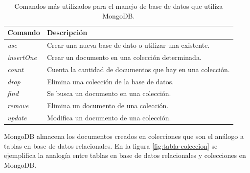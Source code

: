 \begin{table}[h]
	\centering
	\caption[Comandos utilizados en MongoDB]{Comandos más utilizados para el manejo de base de datos que utiliza MongoDB.}
	\begin{tabular}{l l }    
		\toprule
		\textbf{Comando} 	 & \textbf{Descripción} 		\\
		\midrule
	
		\textit{use} 							& Crear una nueva base de dato o utilizar una existente.\\		
		\textit{insertOne}					& Crear un documento en una colección determinada.\\	
		\textit{count}						& Cuenta la cantidad de documentos que hay en una colección.\\	
		\textit{drop}							& Elimina una colección de la base de datos.\\	
		\textit{find	} 						& Se busca un documento en una colección.\\
		\textit{remove}	 					& Elimina un documento de una colección.\\
		\textit{update}						& Modifica un documento de una colección.\\
		
		\bottomrule
		\hline
	\end{tabular}
	\label{tab:mongo-commands}
\end{table}

MongoDB almacena los documentos creados en colecciones que son el análogo a tablas en base de datos relacionales.  En la figura \ref{fig:tabla-coleccion} se ejemplifica la analogía entre tablas en base de datos relacionales y colecciones en MongoDB.

